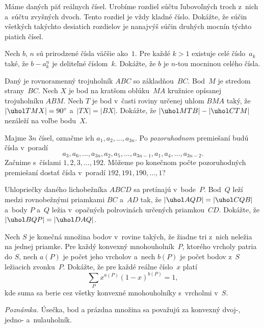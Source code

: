 {%
Máme daných päť reálnych čísel. Urobíme rozdiel súčtu ľubovoľných troch z~nich a~súčtu zvyšných dvoch. Tento rozdiel je vždy kladné číslo. Dokážte, že súčin všetkých takýchto desiatich rozdielov je nanajvýš súčin druhých mocnín týchto piatich čísel.}

{%
Nech $b$, $n$ sú prirodzené čísla väčšie ako~$1$. Pre každé $k>1$ existuje celé číslo~$a_k$ také, že $b-a_k^n$ je deliteľné číslom~$k$. Dokážte, že $b$ je $n$-tou mocninou celého čísla.
}

{%
Daný je rovnoramenný trojuholník $ABC$ so základňou~$BC$. Bod~$M$ je stredom strany~$BC$. Nech $X$ je bod na kratšom oblúku~$MA$ kružnice opísanej trojuholníku $ABM$. Nech $T$ je bod v~časti roviny určenej uhlom $BMA$ taký, že $|\uhol TMX|=90^\circ$ a~$|TX|=|BX|$. Dokážte, že $|\uhol MTB|-|\uhol CTM|$ nezáleží na voľbe bodu~$X$.
}

{%
Majme $3n$ čísel, označme ich $a_1,a_2,\dots,a_{3n}$. Po {\it pozoruhodnom\/} premiešaní budú čísla v~poradí
$$
a_3,a_6,\dots,a_{3n},a_2,a_5,\dots,a_{3n-1},a_1,a_4,\dots,a_{3n-2}.
$$
Začnime s~číslami $1,2,3,\dots,192$. Môžeme po konečnom počte pozoruhodných premiešaní dostať čísla v~poradí $192,191,190,\dots,1$?}

{%
Uhlopriečky daného lichobežníka $ABCD$ sa pretínajú v~bode~$P$. Bod~$Q$ leží medzi rovnobežnými priamkami $BC$ a~$AD$ tak, že $|\uhol AQD|=|\uhol CQB|$ a~body $P$ a~$Q$ ležia v~opačných polrovinách určených priamkou~$CD$. Dokážte, že $|\uhol BQP|=|\uhol DAQ|$.
}

{%
Nech $S$ je konečná množina bodov v~rovine takých, že žiadne tri z~nich neležia na jednej priamke. Pre každý konvexný mnohouholník~$P$, ktorého vrcholy patria do $S$, nech $a(P)$ je počet jeho vrcholov a~nech $b(P)$ je počet bodov z~$S$ ležiacich zvonku~$P$. Dokážte, že pre každé reálne číslo~$x$ platí
$$
\sum_P x^{a(P)}(1-x)^{b(P)}=1,
$$
kde suma sa berie cez všetky konvexné mnohouholníky s~vrcholmi v~$S$.

{\it Poznámka.}
Úsečka, bod a prázdna množina sa považujú za konvexný dvoj-, jedno- a~nulauholník.}

